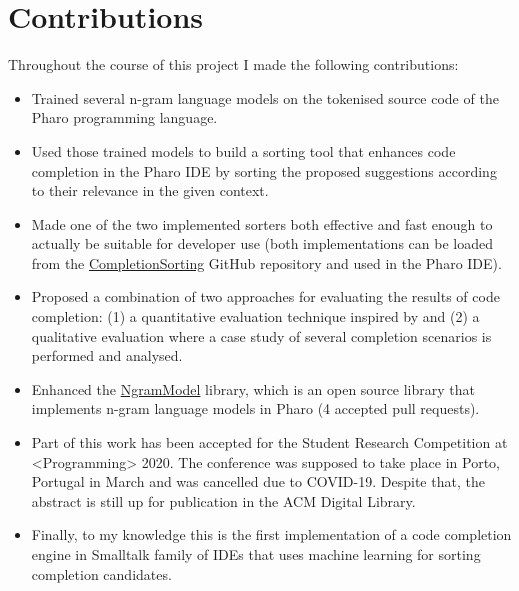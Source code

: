 \section{Contributions}
\label{sec:Introduction-Contributions}
Throughout the course of this project I made the following contributions:
\begin{itemize}
    \item Trained several n-gram language models on the tokenised source code of the Pharo programming language.
    \item Used those trained models to build a sorting tool that enhances code completion in the Pharo IDE by sorting the proposed suggestions according to their relevance in the given context.
    \item Made one of the two implemented sorters both effective and fast enough to actually be suitable for developer use (both implementations can be loaded from the \href{https://github.com/myroslavarm/CompletionSorting}{CompletionSorting} GitHub repository and used in the Pharo IDE).
    \item Proposed a combination of two approaches for evaluating the results of code completion: (1) a quantitative evaluation technique inspired by \cite{Robb08a} and (2) a qualitative evaluation where a case study of several completion scenarios is performed and analysed.
    \item Enhanced the \href{https://github.com/pharo-ai/NgramModel}{NgramModel} library, which is an open source library that implements n-gram language models in Pharo (4 accepted pull requests).
    \item Part of this work has been accepted for the Student Research Competition at <Programming> 2020. The conference was supposed to take place in Porto, Portugal in March and was cancelled due to COVID-19. Despite that, the abstract is still up for publication in the ACM Digital Library.
    \item Finally, to my knowledge this is the first implementation of a code completion engine in Smalltalk family of IDEs that uses machine learning for sorting completion candidates.
\end{itemize}

